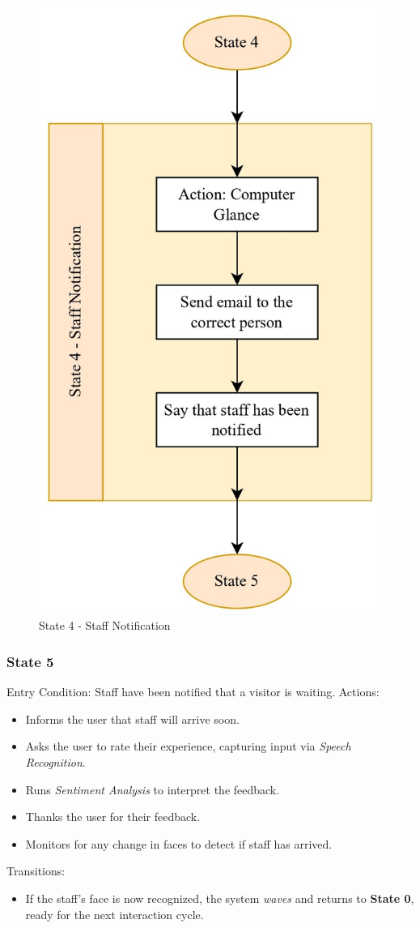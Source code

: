 \documentclass[conference]{IEEEtran}
\begin{document}
\begin{figure}
    \centering
    \includegraphics[width=.6\linewidth]{State 4 - Staff Notification.jpg}
    \caption{State 4 - Staff Notification}
    \label{State 4 - Staff Notification}
\end{figure}

\subsubsection{State 5}
Entry Condition:
Staff have been notified that a visitor is waiting.
Actions:
\begin{itemize}
  \item Informs the user that staff will arrive soon.
  \item Asks the user to rate their experience, capturing input via \emph{Speech Recognition}.
  \item Runs \emph{Sentiment Analysis} to interpret the feedback.
  \item Thanks the user for their feedback.
  \item Monitors for any change in faces to detect if staff has arrived.
\end{itemize}
Transitions:
\begin{itemize}
  \item If the staff’s face is now recognized, the system \emph{waves} and returns to \textbf{State 0}, ready for the next interaction cycle.
\end{itemize}
\end{document}
